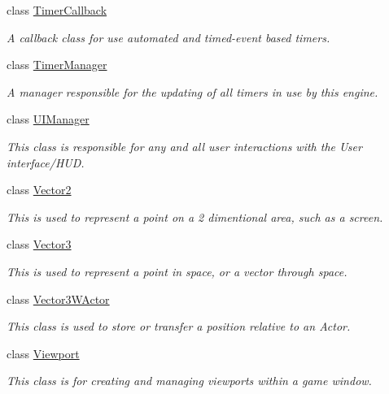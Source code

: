 \begin{DoxyCompactItemize}
class \hyperlink{classphys_1_1TimerCallback}{TimerCallback}
\begin{DoxyCompactList}\small\item\em A callback class for use automated and timed-\/event based timers. \item\end{DoxyCompactList}\item 
class \hyperlink{classphys_1_1TimerManager}{TimerManager}
\begin{DoxyCompactList}\small\item\em A manager responsible for the updating of all timers in use by this engine. \item\end{DoxyCompactList}\item 
class \hyperlink{classphys_1_1UIManager}{UIManager}
\begin{DoxyCompactList}\small\item\em This class is responsible for any and all user interactions with the User interface/HUD. \item\end{DoxyCompactList}\item 
class \hyperlink{classphys_1_1Vector2}{Vector2}
\begin{DoxyCompactList}\small\item\em This is used to represent a point on a 2 dimentional area, such as a screen. \item\end{DoxyCompactList}\item 
class \hyperlink{classphys_1_1Vector3}{Vector3}
\begin{DoxyCompactList}\small\item\em This is used to represent a point in space, or a vector through space. \item\end{DoxyCompactList}\item 
class \hyperlink{classphys_1_1Vector3WActor}{Vector3WActor}
\begin{DoxyCompactList}\small\item\em This class is used to store or transfer a position relative to an Actor. \item\end{DoxyCompactList}\item 
class \hyperlink{classphys_1_1Viewport}{Viewport}
\begin{DoxyCompactList}\small\item\em This class is for creating and managing viewports within a game window. \item\end{DoxyCompactList}\item 

\end{DoxyCompactItemize}
